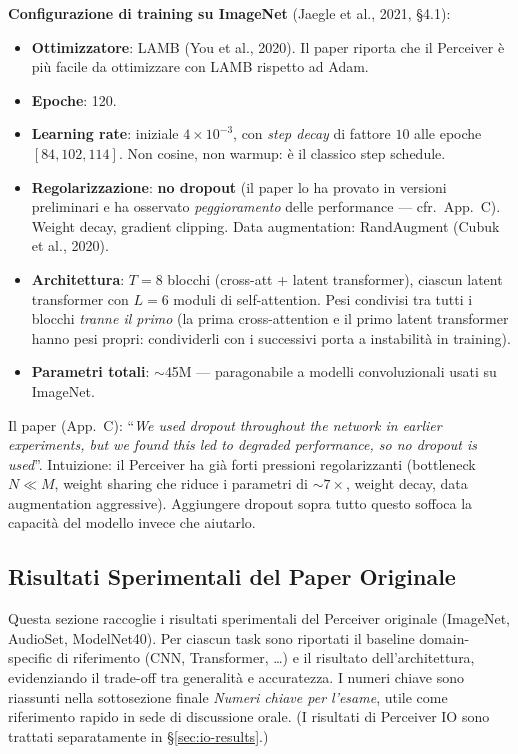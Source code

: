 \documentclass[
  11pt,
]{article}
\begin{document}
\textbf{Configurazione di training su ImageNet} (Jaegle et al., 2021, \S4.1):
\begin{itemize}
\item \textbf{Ottimizzatore}: LAMB (You et al., 2020). Il paper riporta che il Perceiver è più facile da ottimizzare con LAMB rispetto ad Adam.
\item \textbf{Epoche}: 120.
\item \textbf{Learning rate}: iniziale $4 \times 10^{-3}$, con \emph{step decay} di fattore $10$ alle epoche $[84, 102, 114]$. Non cosine, non warmup: è il classico step schedule.
\item \textbf{Regolarizzazione}: \textbf{no dropout} (il paper lo ha provato in versioni preliminari e ha osservato \emph{peggioramento} delle performance --- cfr.\ App.\ C). Weight decay, gradient clipping. Data augmentation: RandAugment (Cubuk et al., 2020).
\item \textbf{Architettura}: $T = 8$ blocchi (cross-att + latent transformer), ciascun latent transformer con $L = 6$ moduli di self-attention. Pesi condivisi tra tutti i blocchi \emph{tranne il primo} (la prima cross-attention e il primo latent transformer hanno pesi propri: condividerli con i successivi porta a instabilità in training).
\item \textbf{Parametri totali}: $\sim$45M --- paragonabile a modelli convoluzionali usati su ImageNet.
\end{itemize}

\begin{notabox}[title={\textbf{Perché no dropout?}}]
Il paper (App.\ C): ``\emph{We used dropout throughout the network in earlier experiments, but we found this led to degraded performance, so no dropout is used}''. Intuizione: il Perceiver ha già forti pressioni regolarizzanti (bottleneck $N \ll M$, weight sharing che riduce i parametri di $\sim7\times$, weight decay, data augmentation aggressive). Aggiungere dropout sopra tutto questo soffoca la capacità del modello invece che aiutarlo.
\end{notabox}

\subsection{Risultati Sperimentali del Paper Originale}
\label{sec:results}

Questa sezione raccoglie i risultati sperimentali del Perceiver originale (ImageNet, AudioSet, ModelNet40). Per ciascun task sono riportati il baseline domain-specific di riferimento (CNN, Transformer, \ldots) e il risultato dell'architettura, evidenziando il trade-off tra generalità e accuratezza. I numeri chiave sono riassunti nella sottosezione finale \emph{Numeri chiave per l'esame}, utile come riferimento rapido in sede di discussione orale. (I risultati di Perceiver IO sono trattati separatamente in \S\ref{sec:io-results}.)
\end{document}
